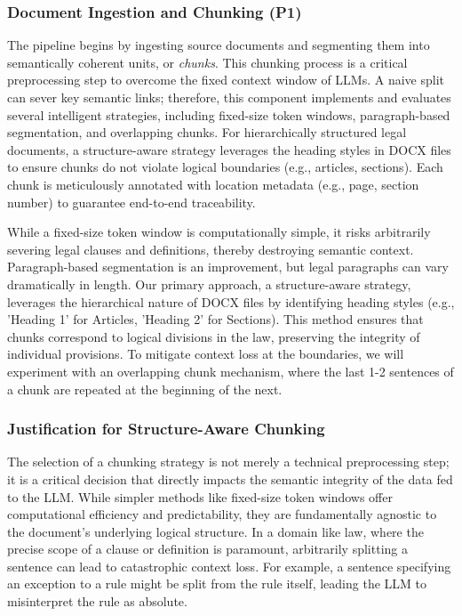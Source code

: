 \subsubsection{Document Ingestion and Chunking (P1)}
The pipeline begins by ingesting source documents and segmenting them into semantically coherent units, or \textit{chunks}. This chunking process is a critical preprocessing step to overcome the fixed context window of LLMs. A naive split can sever key semantic links; therefore, this component implements and evaluates several intelligent strategies, including fixed-size token windows, paragraph-based segmentation, and overlapping chunks. For hierarchically structured legal documents, a structure-aware strategy leverages the heading styles in DOCX files to ensure chunks do not violate logical boundaries (e.g., articles, sections). Each chunk is meticulously annotated with location metadata (e.g., page, section number) to guarantee end-to-end traceability.

While a fixed-size token window is computationally simple, it risks arbitrarily severing legal clauses and definitions, thereby destroying semantic context. Paragraph-based segmentation is an improvement, but legal paragraphs can vary dramatically in length. Our primary approach, a structure-aware strategy, leverages the hierarchical nature of DOCX files by identifying heading styles (e.g., 'Heading 1' for Articles, 'Heading 2' for Sections). This method ensures that chunks correspond to logical divisions in the law, preserving the integrity of individual provisions. To mitigate context loss at the boundaries, we will experiment with an overlapping chunk mechanism, where the last 1-2 sentences of a chunk are repeated at the beginning of the next.

\subsubsection{Justification for Structure-Aware Chunking}
The selection of a chunking strategy is not merely a technical preprocessing step; it is a critical decision that directly impacts the semantic integrity of the data fed to the LLM. While simpler methods like fixed-size token windows offer computational efficiency and predictability, they are fundamentally agnostic to the document's underlying logical structure. In a domain like law, where the precise scope of a clause or definition is paramount, arbitrarily splitting a sentence can lead to catastrophic context loss. For example, a sentence specifying an exception to a rule might be split from the rule itself, leading the LLM to misinterpret the rule as absolute.

